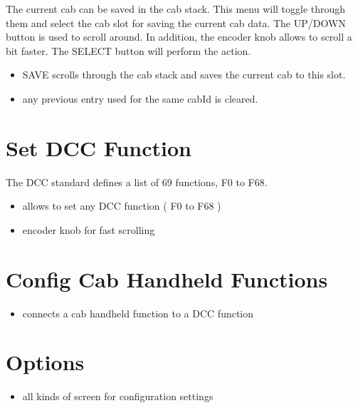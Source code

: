 The current cab can be saved in the cab stack. This menu will toggle through them and select the cab slot for saving the current cab data. The UP/DOWN button is used to scroll around. In addition, the encoder knob allows to scroll a bit faster. The SELECT button will perform the action.
\begin{itemize}
\begin{itemize}
\item SAVE scrolls through the cab stack and saves the current cab to this slot.
\item any previous entry used for the same cabId is cleared.
\end{itemize}
\end{itemize}

\section{Set DCC Function}

The DCC standard defines a list of 69 functions, F0 to F68.
\begin{itemize}
\begin{itemize}
\item allows to set any DCC function ( F0 to F68 )
\item encoder knob for fast scrolling
\end{itemize}
\end{itemize}

\section{Config Cab Handheld Functions}

\begin{itemize}
\begin{itemize}
\item connects a cab handheld function to a DCC function
\end{itemize}
\end{itemize}

\section{Options}

\begin{itemize}
\begin{itemize}
\item all kinds of screen for configuration settings
\end{itemize}
\end{itemize}

